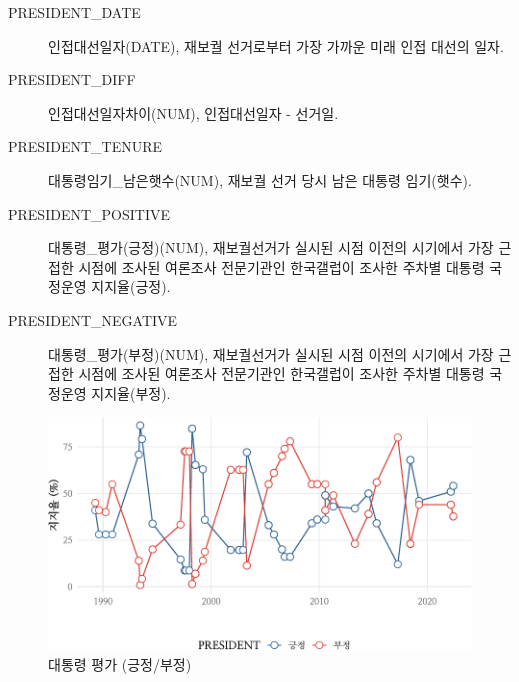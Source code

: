 \documentclass[
  11pt,
  letter]{article}
\begin{document}
\begin{description}
\item[PRESIDENT\_DATE]
인접대선일자(DATE), 재보궐 선거로부터 가장 가까운 미래 인접 대선의 일자.
\item[PRESIDENT\_DIFF]
인접대선일자차이(NUM), 인접대선일자 - 선거일.
\item[PRESIDENT\_TENURE]
대통령임기\_남은햇수(NUM), 재보궐 선거 당시 남은 대통령 임기(햇수).
\item[PRESIDENT\_POSITIVE]
대통령\_평가(긍정)(NUM), 재보궐선거가 실시된 시점 이전의 시기에서 가장
근접한 시점에 조사된 여론조사 전문기관인 한국갤럽이 조사한 주차별 대통령
국정운영 지지율(긍정).
\item[PRESIDENT\_NEGATIVE]
대통령\_평가(부정)(NUM), 재보궐선거가 실시된 시점 이전의 시기에서 가장
근접한 시점에 조사된 여론조사 전문기관인 한국갤럽이 조사한 주차별 대통령
국정운영 지지율(부정).
\end{description}

\begin{figure}
\centering
\includegraphics{Codebook_national_files/figure-latex/unnamed-chunk-18-1.pdf}
\caption{대통령 평가 (긍정/부정)}
\end{figure}
\end{document}
